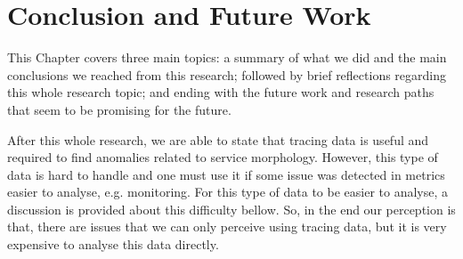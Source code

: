 \glsresetall
\chapter{Conclusion and Future Work}
\label{chap:conclusion_and_future_work}



This Chapter covers three main topics: a summary of what we did and the main conclusions we reached from this research; followed by brief reflections regarding this whole research topic; and ending with the future work and research paths that seem to be promising for the future.



After this whole research, we are able to state that tracing data is useful and required to find anomalies related to service morphology. However, this type of data is hard to handle and one must use it if some issue was detected in metrics easier to analyse, e.g. monitoring. For this type of data to be easier to analyse, a discussion is provided about this difficulty bellow. So, in the end our perception is that, there are issues that we can only perceive using tracing data, but it is very expensive to analyse this data directly.

